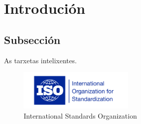 \section{Introdución}
\subsection{Subsección}

As tarxetas intelixentes.~\cite{web:1}\\

\begin{figure}[h]
	\centering
	\includegraphics[width=0.5\textwidth]{imaxes/iso.png}
	\caption{International Standards Organization}
\end{figure}

